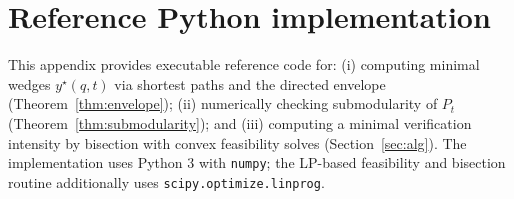 \documentclass[final,3p,times]{elsarticle}
\theoremstyle{plain}
\theoremstyle{definition}
\newcommand{\1}{\mathbbm{1}}
\begin{document}
\section{Reference Python implementation}
\label{app:code}
This appendix provides executable reference code for: 
(i) computing minimal wedges $y^\star(q,t)$ via shortest paths and the directed envelope
(Theorem~\ref{thm:envelope}); 
(ii) numerically checking submodularity of $P_t$ (Theorem~\ref{thm:submodularity}); and
(iii) computing a minimal verification intensity by bisection with convex feasibility solves
(Section~\ref{sec:alg}). The implementation uses Python 3 with \texttt{numpy}; the LP-based
feasibility and bisection routine additionally uses \texttt{scipy.optimize.linprog}.

\lstset{
  basicstyle=\ttfamily\footnotesize,
  breaklines=true,
  columns=fullflexible,
  keepspaces=true,
  frame=single
}
\end{document}
